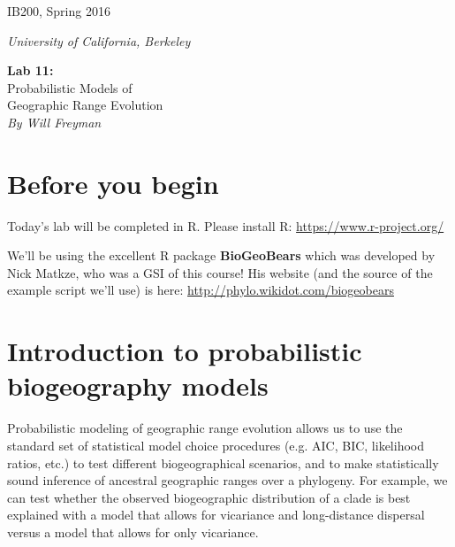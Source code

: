 \documentclass[11pt]{article}
\begin{document}
\noindent
\large
\begin{minipage}{0.5\textwidth}
\begin{flushleft} 
IB200, Spring 2016
\end{flushleft}
\end{minipage}
\begin{minipage}{0.5\textwidth}
\begin{flushright} 
\textit{University of California, Berkeley}
\end{flushright}
\end{minipage}

\vspace{0.5cm}


\begin{center}
\Large \textbf{Lab 11:} \\
Probabilistic Models of \\
Geographic Range Evolution \\
\normalsize
\textit{By Will Freyman} \\
\end{center}

\vspace{0.5cm}

\section{Before you begin}

Today's lab will be completed in R.
Please install R: \url{https://www.r-project.org/}

We'll be using the excellent R package \textbf{BioGeoBears} \citep{matzke2013biogeobears}
which was developed by Nick Matkze, who was a GSI of this course!
His website (and the source of the example script we'll use)
is here:
\url{http://phylo.wikidot.com/biogeobears}

\section{Introduction to probabilistic biogeography models}


Probabilistic modeling of geographic range evolution 
allows us to use the standard set of statistical model choice
procedures (e.g. AIC, BIC, likelihood ratios, etc.)
to test different biogeographical scenarios,
and to make statistically sound inference of ancestral
geographic ranges over a phylogeny.
For example, we can test whether the observed 
biogeographic distribution of a clade is best
explained with a model that allows for 
vicariance and long-distance dispersal versus
a model that allows for only vicariance.
\end{document}
